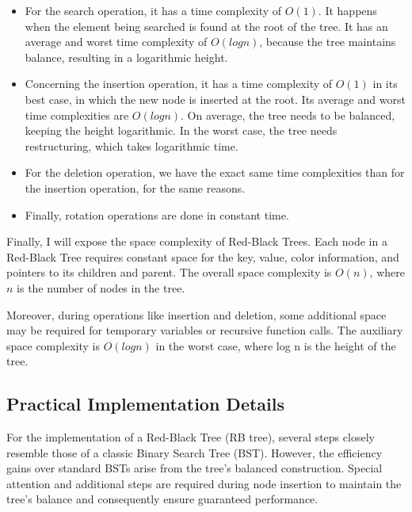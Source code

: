 \documentclass[12pt]{amsart}
\begin{document}
    \begin{itemize}
    	\item For the search operation, it has a time complexity
            of $O(1)$. It happens when the element being
            searched is found at the root of the tree. It has an
            average and worst time complexity of $O(log n)$,
            because the tree maintains balance, resulting in a
            logarithmic height.
    	
    	\item Concerning the insertion operation, it has a time
            complexity of $O(1)$ in its best case, in which the
            new node is inserted at the root. Its average and
            worst time complexities are $O(log n)$. On average,
            the tree needs to be balanced, keeping the height
            logarithmic. In the worst case, the tree needs
            restructuring, which takes logarithmic time.
    	
    	\item For the deletion operation, we have the exact same
            time complexities than for the insertion operation,
            for the same reasons.
    	
    	\item Finally, rotation operations are done in constant
            time.
    \end{itemize}
    
    Finally, I will expose the space complexity of Red-Black
    Trees. Each node in a Red-Black Tree requires constant space
    for the key, value, color information, and pointers to its
    children and parent. The overall space complexity is $O(n)$,
    where $n$ is the number of nodes in the tree.
    
    Moreover, during operations like insertion and deletion,
    some additional space may be required for temporary
    variables or recursive function calls. The auxiliary space
    complexity is $O(log n)$ in the worst case, where log n is
    the height of the tree.

\subsection{Practical Implementation Details}

    For the implementation of a Red-Black Tree (RB tree), several steps closely 
    resemble those of a classic Binary Search Tree (BST). However, the efficiency
     gains over standard BSTs arise from the tree's balanced construction. 
     Special attention and additional steps are required during node insertion 
     to maintain the tree's balance and consequently ensure guaranteed performance.
\end{document}
